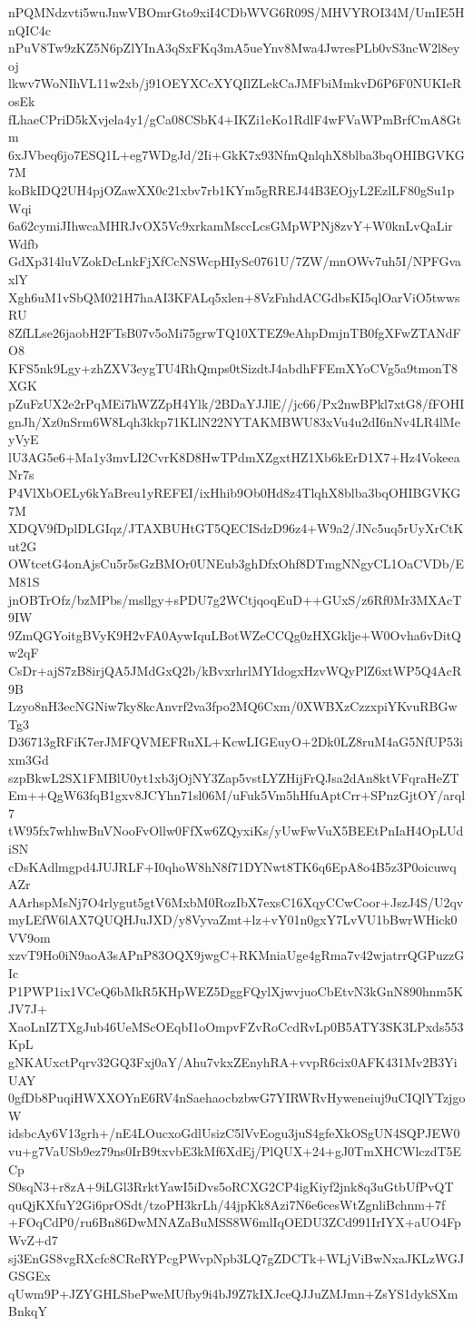 nPQMNdzvti5wuJnwVBOmrGto9xiI4CDbWVG6R09S/MHVYROI34M/UmIE5HnQIC4c
nPuV8Tw9zKZ5N6pZlYInA3qSxFKq3mA5ueYnv8Mwa4JwresPLb0vS3ncW2l8eyoj
lkwv7WoNIhVL11w2xb/j91OEYXCcXYQIlZLekCaJMFbiMmkvD6P6F0NUKIeRosEk
fLhaeCPriD5kXvjela4y1/gCa08CSbK4+IKZi1eKo1RdlF4wFVaWPmBrfCmA8Gtm
6xJVbeq6jo7ESQ1L+eg7WDgJd/2Ii+GkK7x93NfmQnlqhX8blba3bqOHIBGVKG7M
koBkIDQ2UH4pjOZawXX0c21xbv7rb1KYm5gRREJ44B3EOjyL2EzlLF80gSu1pWqi
6a62cymiJIhwcaMHRJvOX5Vc9xrkamMsccLcsGMpWPNj8zvY+W0knLvQaLirWdfb
GdXp314luVZokDcLnkFjXfCcNSWcpHIySc0761U/7ZW/mnOWv7uh5I/NPFGvaxlY
Xgh6uM1vSbQM021H7haAI3KFALq5xlen+8VzFnhdACGdbsKI5qlOarViO5twwsRU
8ZfLLse26jaobH2FTsB07v5oMi75grwTQ10XTEZ9eAhpDmjnTB0fgXFwZTANdFO8
KFS5nk9Lgy+zhZXV3eygTU4RhQmps0tSizdtJ4abdhFFEmXYoCVg5a9tmonT8XGK
pZuFzUX2e2rPqMEi7hWZZpH4Ylk/2BDaYJJlE//jc66/Px2nwBPkl7xtG8/fFOHI
gnJh/Xz0nSrm6W8Lqh3kkp71KLlN22NYTAKMBWU83xVu4u2dI6nNv4LR4lMeyVyE
lU3AG5e6+Ma1y3mvLI2CvrK8D8HwTPdmXZgxtHZ1Xb6kErD1X7+Hz4VokeeaNr7s
P4VlXbOELy6kYaBreu1yREFEI/ixHhib9Ob0Hd8z4TlqhX8blba3bqOHIBGVKG7M
XDQV9fDplDLGIqz/JTAXBUHtGT5QECISdzD96z4+W9a2/JNc5uq5rUyXrCtKut2G
OWtcetG4onAjsCu5r5sGzBMOr0UNEub3ghDfxOhf8DTmgNNgyCL1OaCVDb/EM81S
jnOBTrOfz/bzMPbs/msllgy+sPDU7g2WCtjqoqEuD++GUxS/z6Rf0Mr3MXAcT9IW
9ZmQGYoitgBVyK9H2vFA0AywIquLBotWZeCCQg0zHXGklje+W0Ovha6vDitQw2qF
CsDr+ajS7zB8irjQA5JMdGxQ2b/kBvxrhrlMYIdogxHzvWQyPlZ6xtWP5Q4AcR9B
Lzyo8nH3ecNGNiw7ky8kcAnvrf2va3fpo2MQ6Cxm/0XWBXzCzzxpiYKvuRBGwTg3
D36713gRFiK7erJMFQVMEFRuXL+KcwLIGEuyO+2Dk0LZ8ruM4aG5NfUP53ixm3Gd
szpBkwL2SX1FMBlU0yt1xb3jOjNY3Zap5vstLYZHijFrQJsa2dAn8ktVFqraHeZT
Em++QgW63fqB1gxv8JCYhn71sl06M/uFuk5Vm5hHfuAptCrr+SPnzGjtOY/arql7
tW95fx7whhwBnVNooFvOllw0FfXw6ZQyxiKs/yUwFwVuX5BEEtPnIaH4OpLUdiSN
cDsKAdlmgpd4JUJRLF+I0qhoW8hN8f71DYNwt8TK6q6EpA8o4B5z3P0oicuwqAZr
AArhspMsNj7O4rlygut5gtV6MxbM0RozIbX7exsC16XqyCCwCoor+JszJ4S/U2qv
myLEfW6lAX7QUQHJuJXD/y8VyvaZmt+lz+vY01n0gxY7LvVU1bBwrWHick0VV9om
xzvT9Ho0iN9aoA3sAPnP83OQX9jwgC+RKMniaUge4gRma7v42wjatrrQGPuzzGIc
P1PWP1ix1VCeQ6bMkR5KHpWEZ5DggFQylXjwvjuoCbEtvN3kGnN890hnm5KJV7J+
XaoLnIZTXgJub46UeMScOEqbI1oOmpvFZvRoCcdRvLp0B5ATY3SK3LPxds553KpL
gNKAUxctPqrv32GQ3Fxj0aY/Ahu7vkxZEnyhRA+vvpR6cix0AFK431Mv2B3YiUAY
0gfDb8PuqiHWXXOYnE6RV4nSaehaocbzbwG7YIRWRvHyweneiuj9uCIQlYTzjgoW
idsbcAy6V13grh+/nE4LOucxoGdlUsizC5lVvEogu3juS4gfeXkOSgUN4SQPJEW0
vu+g7VaUSb9ez79ns0IrB9txvbE3kMf6XdEj/PlQUX+24+gJ0TmXHCWlczdT5ECp
S0sqN3+r8zA+9iLGl3RrktYawI5iDvs5oRCXG2CP4igKiyf2jnk8q3uGtbUfPvQT
quQjKXfuY2Gi6prOSdt/tzoPH3krLh/44jpKk8Azi7N6e6cesWtZgnliBchnm+7f
+FOqCdP0/ru6Bn86DwMNAZaBuMSS8W6mlIqOEDU3ZCd991IrIYX+aUO4FpWvZ+d7
sj3EnGS8vgRXcfc8CReRYPcgPWvpNpb3LQ7gZDCTk+WLjViBwNxaJKLzWGJGSGEx
qUwm9P+JZYGHLSbePweMUfby9i4bJ9Z7kIXJceQJJuZMJmn+ZsYS1dykSXmBnkqY

